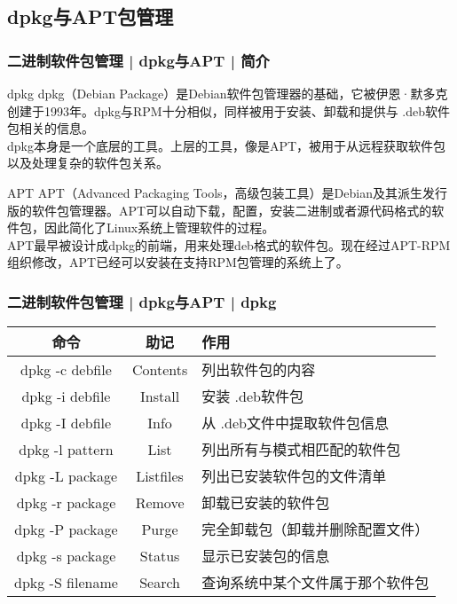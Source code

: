 \subsection{dpkg与APT包管理}
\begin{frame}
  \frametitle{二进制软件包管理 | dpkg与APT | 简介}
  \begin{block}{dpkg}
  dpkg（Debian Package）是Debian软件包管理器的基础，它被伊恩·默多克创建于1993年。dpkg与RPM十分相似，同样被用于安装、卸载和提供与 .deb软件包相关的信息。\\ 

  dpkg本身是一个底层的工具。上层的工具，像是APT，被用于从远程获取软件包以及处理复杂的软件包关系。
  \end{block}
  \pause
  \begin{block}{APT}
  APT（Advanced Packaging Tools，高级包装工具）是Debian及其派生发行版的软件包管理器。APT可以自动下载，配置，安装二进制或者源代码格式的软件包，因此简化了Linux系统上管理软件的过程。\\
  APT最早被设计成dpkg的前端，用来处理deb格式的软件包。现在经过APT-RPM组织修改，APT已经可以安装在支持RPM包管理的系统上了。
  \end{block}
\end{frame}

\begin{frame}
  \frametitle{二进制软件包管理 | dpkg与APT | \alert{dpkg}}
  \begin{table}
    \centering
    \begin{tabularx}{\textwidth}{ccX}
      \hline
      \rowcolor{blue!50}命令 & 助记 & 作用\\
      \hline
      dpkg -c debfile & Contents & 列出软件包的内容\\
      dpkg -i debfile & Install & 安装 .deb软件包\\
      dpkg -I debfile & Info & 从 .deb文件中提取软件包信息\\
      dpkg -l pattern & List & 列出所有与模式相匹配的软件包\\
      dpkg -L package & Listfiles & 列出已安装软件包的文件清单\\
      dpkg -r package & Remove & 卸载已安装的软件包\\
      dpkg -P package & Purge & 完全卸载包（卸载并删除配置文件）\\
      dpkg -s package & Status & 显示已安装包的信息\\
      dpkg -S filename & Search & 查询系统中某个文件属于那个软件包\\
      \hline
    \end{tabularx}
  \end{table}
\end{frame}

